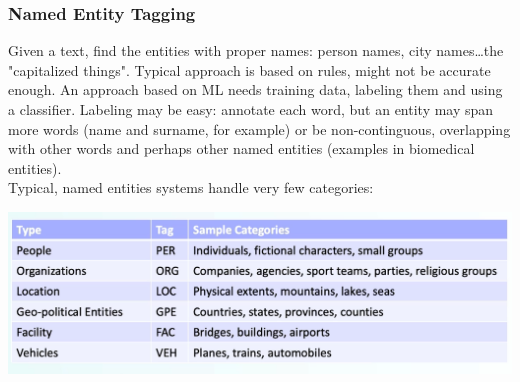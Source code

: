 \documentclass[10pt]{report}
\begin{document}
\subsubsection{Named Entity Tagging}
Given a text, find the entities with proper names: person names, city names\ldots the "capitalized things". Typical approach is based on rules, might not be accurate enough. An approach based on ML needs training data, labeling them and using a classifier. Labeling may be easy: annotate each word, but an entity may span more words (name and surname, for example) or be non-continguous, overlapping with other words and perhaps other named entities (examples in biomedical entities).\\
Typical, named entities systems handle very few categories:
\begin{center}
	\includegraphics[scale=0.33]{20.png}
\end{center}
\end{document}

